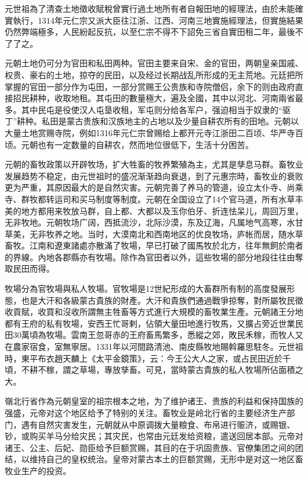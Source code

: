 元世祖為了清查土地徵收賦稅曾實行過土地所有者自報田地的經理法，由於未能確實執行，1314年元仁宗又派大臣往江浙、江西、河南三地實施經理法，但實施結果仍然弊端極多，人民紛起反抗，以至仁宗不得不下詔免三省自實田租二年，最後不了了之。

元朝土地仍可分为官田和私田两种。官田主要来自宋、金的官田，两朝皇亲国戚、权贵、豪右的土地，掠夺的民田，以及经过长期战乱所形成的无主荒地。元廷把所掌握的官田一部分作为屯田，一部分赏赐王公贵族和寺院僧侣，余下的则由政府直接招民耕种，收取地租。其屯田的數量極大，遍及全國，其中以河北、河南兩省最多。其中民屯是役使汉人屯垦收租，军屯则分给各军户，强迫相当于奴隶的“驱丁”耕种。私田是蒙古贵族和汉族地主的占地以及少量自耕农所有的田地。元朝以大量土地赏赐寺院，例如1316年元仁宗曾赐给上都开元寺江浙田二百顷、华严寺百顷。元朝也有一定数量的自耕农，然而地位很低下，生活十分困苦。

元朝的畜牧政策以开辟牧场，扩大牲畜的牧养繁殖為主，尤其是孳息马群。畜牧业发展趋势不稳定，由元世祖时的盛况渐渐趋向衰退，到了元惠宗時，畜牧业的衰败更为严重，其原因最大的是自然灾害。元朝完善了养马的管道，设立太仆寺、尚乘寺、群牧都转运司和买马制度等制度。元朝在全国设立了14个官马道，所有水草丰美的地方都用来牧放马群，自上都、大都以及玉你伯牙、折连怯呆儿，周回万里，无非牧地。元朝牧场广阔，西抵流沙，北际沙漠，东及辽海，凡属地气高寒，水甘草美，无非牧养之地。当时，大漠南北和西南地区的优良牧场，庐帐而居，随水草畜牧。江南和遼東諸處亦散滿了牧場，早已打破了國馬牧於北方，往年無飼於南者的界線。內地各郡縣亦有牧場。除作為官田者以外，這些牧場的部分地段往往由奪取民田而得。

牧場分為官牧場與私人牧場。官牧場是12世紀形成的大畜群所有制的高度發展形態，也是大汗和各級蒙古貴族的財產。大汗和貴族們通過戰爭掠奪，對所屬牧民徵收貢賦，收買和沒收所謂無主牲畜等方式進行大規模的畜牧業生產。元朝諸王分地都有王府的私有牧場，安西王忙哥剌，佔領大量田地進行牧馬，又擴占旁近世業民田30萬頃為牧場。雲南王忽哥赤的王府畜馬繁多，悉縱之郊，敗民禾稼，而牧人又在農家宿食，室無寧居。1331年以河間路清池、南皮縣牧地賜斡羅思駐冬。元世祖時，東平布衣趙天麟上《太平金鏡策》，云：今王公大人之家，或占民田近於千頃，不耕不稼，謂之草場，專放孳畜。可見，當時蒙古貴族的私人牧場所佔面積之大。

嶺北行省作為元朝皇室的祖宗根本之地，为了维护诸王、贵族的利益和保持国族的强盛，元帝对这个地区给予了特别的关注。畜牧业是岭北行省的主要经济生产部门，遇有自然灾害发生，元朝就从中原调拨大量粮食、布帛进行赈济，或赐银、钞，或购买羊马分给灾民；其灾民，也常由元廷发给资粮，遣送回居本部。元帝对诸王、公主、后妃、勋臣给予巨额赏赐，其目的在于巩固贵族、官僚集团之间的团结，以维持自己的皇权统治。皇帝对蒙古本土的巨额赏赐，无形中是对这一地区畜牧业生产的投资。

